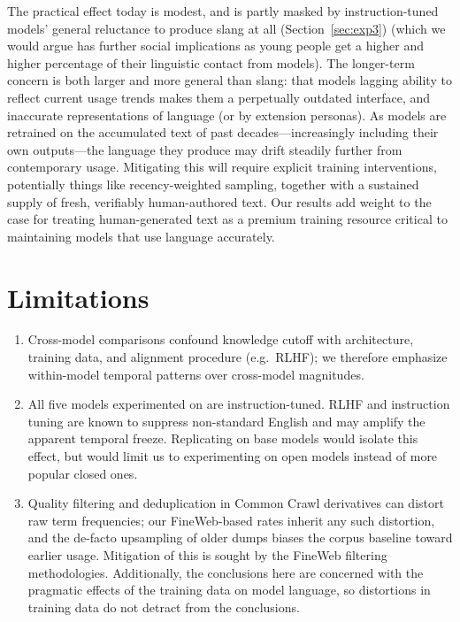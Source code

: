 \documentclass[11pt]{article}
\begin{document}
The practical effect today is modest, and is partly masked by instruction-tuned models' general reluctance to produce slang at all (Section~\ref{sec:exp3}) (which we would argue has further social implications as young people get a higher and higher percentage of their linguistic contact from models). The longer-term concern is both larger and more general than slang: that models lagging ability to reflect current usage trends makes them a perpetually outdated interface, and inaccurate representations of language (or by extension personas). As models are retrained on the accumulated text of past decades---increasingly including their own outputs---the language they produce may drift steadily further from contemporary usage. Mitigating this will require explicit training interventions, potentially things like recency-weighted sampling, together with a sustained supply of fresh, verifiably human-authored text. Our results add weight to the case for treating human-generated text as a premium training resource critical to maintaining models that use language accurately.

\section{Limitations}%
\label{sec:limitations}

\begin{enumerate}
  \item Cross-model comparisons confound knowledge cutoff with architecture, training data, and alignment procedure (e.g.\ RLHF); we therefore emphasize within-model temporal patterns over cross-model magnitudes.
  \item All five models experimented on are instruction-tuned. RLHF and instruction tuning are known to suppress non-standard English \citep{barnhart2025rlhf} and may amplify the apparent temporal freeze. Replicating on base models would isolate this effect, but would limit us to experimenting on open models instead of more popular closed ones.
  \item Quality filtering and deduplication in Common Crawl derivatives can distort raw term frequencies; our FineWeb-based rates inherit any such distortion, and the de-facto upsampling of older dumps \citep{cheng2024dated} biases the corpus baseline toward earlier usage. Mitigation of this is sought by the FineWeb filtering methodologies. Additionally, the conclusions here are concerned with the pragmatic effects of the training data on model language, so distortions in training data do not detract from the conclusions.
\end{enumerate}
\end{document}
